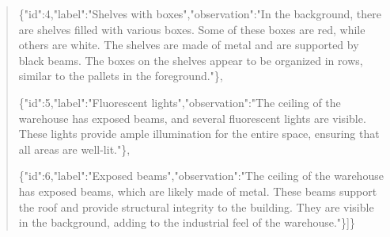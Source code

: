 \documentclass[10pt,a4paper]{article}
\begin{document}
\begin{quote}
\par
\{"id":\allowbreak{}4,\allowbreak{}"label":\allowbreak{}"Shelves with boxes",\allowbreak{}"observation":\allowbreak{}"In the background,\allowbreak{} there are shelves filled with various boxes. Some of these boxes are red,\allowbreak{} while others are white. The shelves are made of metal and are supported by black beams. The boxes on the shelves appear to be organized in rows,\allowbreak{} similar to the pallets in the foreground."\},\allowbreak{}\par
\par
\{"id":\allowbreak{}5,\allowbreak{}"label":\allowbreak{}"Fluorescent lights",\allowbreak{}"observation":\allowbreak{}"The ceiling of the warehouse has exposed beams,\allowbreak{} and several fluorescent lights are visible. These lights provide ample illumination for the entire space,\allowbreak{} ensuring that all areas are well-lit."\},\allowbreak{}\par
\par
\{"id":\allowbreak{}6,\allowbreak{}"label":\allowbreak{}"Exposed beams",\allowbreak{}"observation":\allowbreak{}"The ceiling of the warehouse has exposed beams,\allowbreak{} which are likely made of metal. These beams support the roof and provide structural integrity to the building. They are visible in the background,\allowbreak{} adding to the industrial feel of the warehouse."\}]\}
\end{quote}
\end{document}

